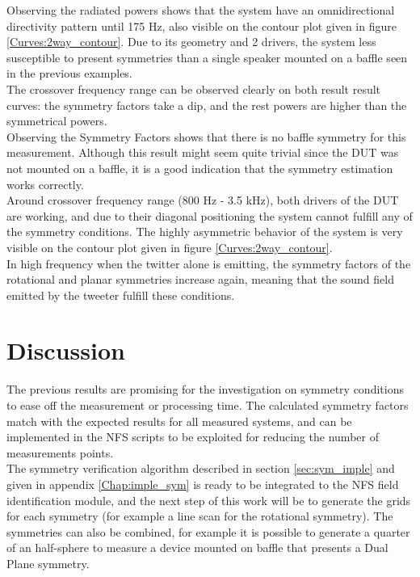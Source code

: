 \documentclass{report}
\begin{document}
\vspace{0.4cm}

Observing the radiated powers shows that the system have an omnidirectional directivity pattern until 175 Hz, also visible on the contour plot given in figure \ref{Curves:2way_contour}. Due to its geometry and 2 drivers, the system less susceptible to present symmetries than a single speaker mounted on a baffle seen in the previous examples.\\
The crossover frequency range can be observed clearly on both result result curves: the symmetry factors take a dip, and the rest powers are higher than the symmetrical powers. \\

Observing the Symmetry Factors shows that there is no baffle symmetry for this measurement. Although this result might seem quite trivial since the DUT was not mounted on a baffle, it is a good indication that the symmetry estimation works correctly. \\
Around crossover frequency range (800 Hz - 3.5 kHz), both drivers of the DUT are working, and due to their diagonal positioning the system cannot fulfill any of the symmetry conditions. The highly asymmetric behavior of the system is very visible on the contour plot given in figure \ref{Curves:2way_contour}. \\
In high frequency when the twitter alone is emitting, the symmetry factors of the rotational and planar symmetries increase again, meaning that the sound field emitted by the tweeter fulfill these conditions. 

\section{Discussion}

The previous results are promising for the investigation on symmetry conditions to ease off the measurement or processing time. The calculated symmetry factors match with the expected results for all measured systems, and can be implemented in the NFS scripts to be exploited for reducing the number of measurements points. \\

The symmetry verification algorithm described in section \ref{sec:sym_imple} and given in appendix \ref{Chap:imple_sym} is ready to be integrated to the NFS field identification module, and the next step of this work will be to generate the grids for each symmetry (for example a line scan for the rotational symmetry). The symmetries can also be combined, for example it is possible to generate a quarter of an half-sphere to measure a device mounted on baffle that presents a Dual Plane symmetry. 
\end{document}
